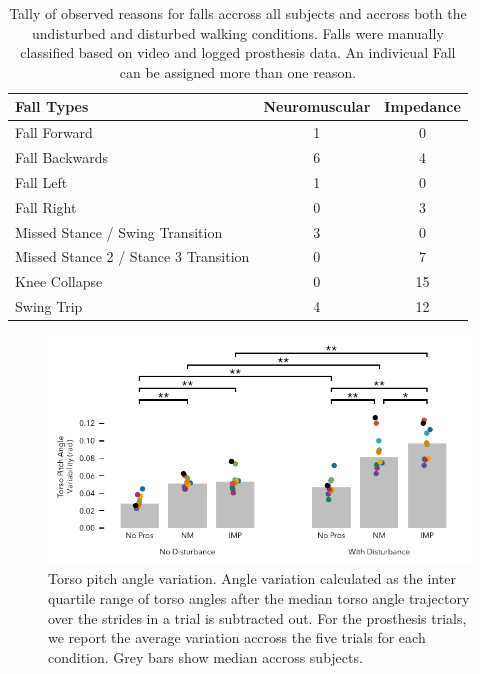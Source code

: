 \begin{table}[h]
  \footnotesize%
  \begin{center}
    \begin{tabular}{lcc}
      \toprule
      Fall Types & Neuromuscular & Impedance \\
      \midrule
      Fall Forward &  1 &  0 \\
      Fall Backwards &  6 &  4 \\
      Fall Left &  1 &  0 \\
      Fall Right &  0 &  3 \\
      Missed Stance / Swing Transition &  3 &  0 \\
      Missed Stance 2 / Stance 3 Transition &  0 &  7 \\
      Knee Collapse & 0 & 15 \\
      Swing Trip & 4 & 12 \\
      \bottomrule
    \end{tabular}
  \end{center}
  \caption{Tally of observed reasons for falls accross all subjects and accross
  both the undisturbed and disturbed walking conditions. Falls were manually
  classified based on video and logged prosthesis data. An indivicual Fall can
  be assigned more than one reason.}\label{tab:treadmill_exp_fall_reasons}
\end{table}

\begin{figure}[h]
    \centering 
    \includegraphics[width=\textwidth]{treadmill_vib_torso_var_x}
    \caption{Torso pitch angle variation. Angle variation calculated as the
    inter quartile range of torso angles after the median torso angle trajectory
    over the strides in a trial is subtracted out. For the prosthesis trials, we
    report the average variation accross the five trials for each condition.
    Grey bars show median accross
    subjects.}\label{fig:treadmill_exp_torso_var_x}
\end{figure}


